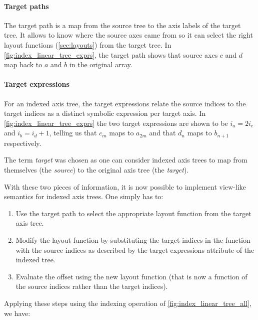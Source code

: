 \documentclass[thesis]{subfiles}
\begin{document}
\paragraph{Target paths}

The target path is a map from the source tree to the axis labels of the target tree.
It allows  to know where the source axes came from so it can select the right layout functions (\cref{sec:layouts}) from the target tree.
In \cref{fig:index_linear_tree_exprs}, the target path shows that source axes $c$ and $d$ map back to $a$ and $b$ in the original array.

\paragraph{Target expressions}

For an indexed axis tree, the target expressions relate the source indices to the target indices as a distinct symbolic expression per target axis.
In \cref{fig:index_linear_tree_exprs} the two target expressions are shown to be $i_a = 2 i_c$ and $i_b = i_d + 1$, telling us that $c_m$ maps to $a_{2m}$ and that $d_n$ maps to $b_{n+1}$ respectively.

The term \textit{target} was chosen as one can consider indexed axis trees to map from themselves (the \textit{source}) to the original axis tree (the \textit{target}).

With these two pieces of information, it is now possible to implement view-like semantics for indexed axis trees.
One simply has to:

\begin{enumerate}
  \item
    Use the target path to select the appropriate layout function from the target axis tree.
  \item
    Modify the layout function by substituting the target indices in the function with the source indices as described by the target expressions attribute of the indexed tree.
  \item
    Evaluate the offset using the new layout function (that is now a function of the source indices rather than the target indices).
\end{enumerate}

Applying these steps using the indexing operation of \cref{fig:index_linear_tree_all}, we have:
\end{document}
